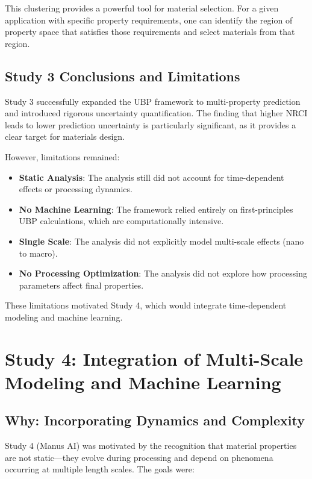 \documentclass[11pt,a4paper]{article}
\begin{document}
This clustering provides a powerful tool for material selection. For a given application with specific property requirements, one can identify the region of property space that satisfies those requirements and select materials from that region.

\subsection{Study 3 Conclusions and Limitations}

Study 3 successfully expanded the UBP framework to multi-property prediction and introduced rigorous uncertainty quantification. The finding that higher NRCI leads to lower prediction uncertainty is particularly significant, as it provides a clear target for materials design.

However, limitations remained:

\begin{itemize}
    \item \textbf{Static Analysis}: The analysis still did not account for time-dependent effects or processing dynamics.
    \item \textbf{No Machine Learning}: The framework relied entirely on first-principles UBP calculations, which are computationally intensive.
    \item \textbf{Single Scale}: The analysis did not explicitly model multi-scale effects (nano to macro).
    \item \textbf{No Processing Optimization}: The analysis did not explore how processing parameters affect final properties.
\end{itemize}

These limitations motivated Study 4, which would integrate time-dependent modeling and machine learning.

\section{Study 4: Integration of Multi-Scale Modeling and Machine Learning}

\subsection{Why: Incorporating Dynamics and Complexity}

Study 4 (Manus AI) was motivated by the recognition that material properties are not static—they evolve during processing and depend on phenomena occurring at multiple length scales. The goals were:
\end{document}
